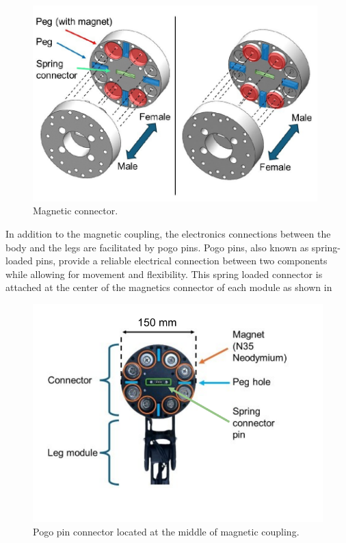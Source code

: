 \begin{figure}[t]
  \centering
  \includegraphics[width=110mm]{./fig/chap2/pogopin/connector2.pdf}
  \vspace{2mm}
  \caption{Magnetic connector.}\label{magnet}
\end{figure}

In addition to the magnetic coupling, the electronics connections between the body and the legs are facilitated by pogo pins. Pogo pins, also known as spring-loaded pins, provide a reliable electrical connection between two components while allowing for movement and flexibility. This spring loaded connector is attached at the center of the magnetics connector of each module as shown in \\

\begin{figure}[h]
  \centering
  \includegraphics[width=120mm]{./fig/chap2/pogopin/connector.pdf}
  \vspace{2mm}
  \caption{Pogo pin connector located at the middle of magnetic coupling.}\label{pogopin}
\end{figure}

